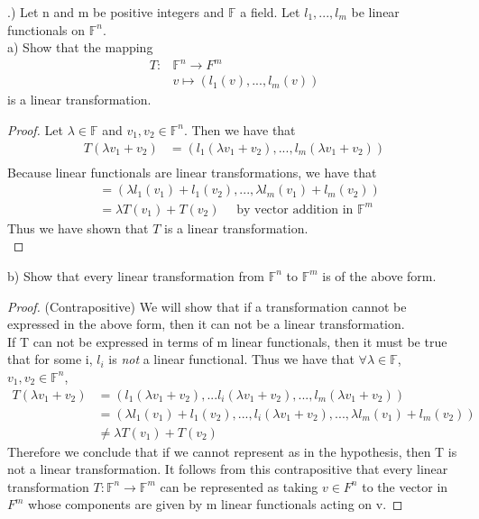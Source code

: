 \documentclass[a4paper, 11pt]{article}
\newcommand{\F}{\mathbb{F}}
\newenvironment{solution}{%
	\begin{list}{}{%
			\setlength{\topsep}{0pt}%
			\setlength{\leftmargin}{1.5cm}%
			\setlength{\rightmargin}{1.5cm}%
			\setlength{\listparindent}{\parindent}%
			\setlength{\itemindent}{\parindent}%
			\setlength{\parsep}{\parskip}%
		}%
		\item[]}{\end{list}}
\begin{document}
.) Let n and m be positive integers and $\F$ a field. Let $l_1,...,l_m$ be linear functionals on $\F^n$. \\
\noindent a) Show that the mapping 
	\begin{align*}
		T: &\F^n \to F^m \\ 
			&v\mapsto (l_1(v), ..., l_m(v))
	\end{align*}
is a linear transformation. \\
	\begin{proof}
		Let $\lambda \in \F$ and $v_1, v_2 \in \F^n$. Then we have that
			\begin{align*}
				T(\lambda v_1 + v_2) &= (l_1(\lambda v_1 + v_2),..., l_m(\lambda v_1 + v_2)) \\ 
			\end{align*}
		Because linear functionals are linear transformations, we have that 
			\begin{align*}
				&= (\lambda l_1(v_1)+l_1(v_2), ..., \lambda l_m(v_1)+l_m(v_2)) \\ 
				&= \lambda T(v_1)+T(v_2) \quad \text{ by vector addition in }\F^m
			\end{align*}
		Thus we have shown that $T$ is a linear transformation. \\
	\end{proof}

\noindent b) Show that every linear transformation from $\F^n$ to $\F^m$ is of the above form. \\
	\begin{solution}
		\begin{proof}
			(Contrapositive) We will show that if a transformation cannot be expressed in the above form, then it can not be a linear transformation. \\
			
			\noindent If T can not be expressed in terms of m linear functionals, then it must be true that for some i, $l_i$ is \textit{not} a linear functional. Thus we have that $\forall \lambda \in \F$, $v_1, v_2 \in \F^n$, 
				\begin{align*}
					T(\lambda v_1 + v_2) &= (l_1(\lambda v_1+v_2), ... l_i(\lambda v_1+v_2), ... , l_m(\lambda v_1 + v_2)) \\ 
						&= (\lambda l_1(v_1)+l_1(v_2), ..., l_i(\lambda v_1 + v_2), ... ,\lambda l_m(v_1)+ l_m(v_2) ) \\ 
						&\neq \lambda T(v_1) + T(v_2) 
				\end{align*}
			\noindent Therefore we conclude that if we cannot represent as in the hypothesis, then T is not a linear transformation. It follows from this contrapositive that every linear transformation $T:\F^n\to\F^m$ can be represented as taking $v\in F^n$ to the vector in $F^m$ whose components are given by m linear functionals acting on v. 
		\end{proof}
	\end{solution}
\end{document}
